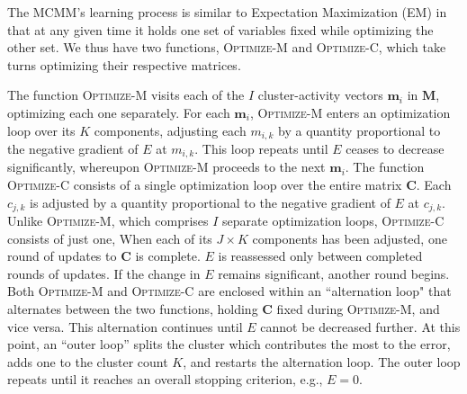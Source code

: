 The MCMM's learning process is similar to Expectation Maximization
(EM) in that at any given time it holds one set of variables 
fixed while optimizing the other set. We thus have two functions, \textsc{Optimize-M}
and \textsc{Optimize-C}, which take turns optimizing their respective matrices.

The function \textsc{Optimize-M} visits each of the $I$ cluster-activity vectors $\mathbf{m}_i$ in
$\mathbf{M}$, optimizing each one separately.
For each $\mathbf{m}_i$, \textsc{Optimize-M} enters an optimization 
loop over its $K$ components, adjusting each 
$m_{i,k}$ by a
quantity proportional to the negative gradient of $E$ at $m_{i,k}$.  
This loop repeats until $E$
ceases to decrease significantly,
whereupon \textsc{Optimize-M} proceeds to the next $\mathbf{m}_i$.  
The function \textsc{Optimize-C} consists of a single optimization loop over the 
entire matrix
$\mathbf{C}$. Each $c_{j,k}$ is adjusted by a quantity
proportional to the negative gradient of $E$ at $c_{j,k}$.
Unlike \textsc{Optimize-M}, which comprises $I$ separate optimization
loops, \textsc{Optimize-C} consists of just one, 
When each of its $J \times K$
components has been adjusted, one round of updates to $\mathbf{C}$ is
complete.  $E$ is reassessed only between completed rounds of
updates. If the change in $E$ remains significant, another round begins.  
Both \textsc{Optimize-M} and \textsc{Optimize-C} are enclosed within 
an ``alternation loop" 
that alternates between the two functions, holding $\mathbf{C}$ fixed
during \textsc{Optimize-M}, and vice versa.
This alternation continues until $E$ cannot be decreased further. At
this point, an ``outer loop''
splits the cluster which contributes the most to the error, adds one
to the cluster count $K$, and restarts the alternation loop. The outer loop
repeats until it reaches an overall stopping criterion, e.g., $E = 0$.
